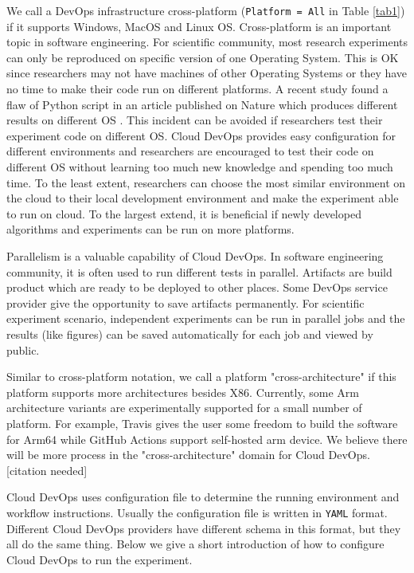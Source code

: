 \documentclass[10pt, conference, compsocconf]{IEEEtran}
\begin{document}
We call a DevOps infrastructure cross-platform (\texttt{Platform = All} in Table  \ref{tab1}) if it supports Windows, MacOS and Linux 
OS.
Cross-platform is an important topic in software engineering. For scientific community, most research experiments can only be reproduced on specific version of one Operating System. This is OK since researchers may not have machines of other Operating Systems or they have no time to make their code run on different platforms. A recent study found a flaw of Python script in an article published on Nature which produces different results on different OS \cite{bhandari2019characterization}. This incident can be avoided if researchers test their experiment code on different OS. Cloud DevOps provides easy configuration for different environments and researchers are encouraged to test their code on different OS without learning too much new knowledge and spending too much time. To the least extent, researchers can choose the most similar environment on the cloud to their local development environment and make the experiment able to run on cloud. To the largest extend, it is beneficial if newly developed algorithms and experiments can be run on more platforms.

Parallelism is a valuable capability of Cloud DevOps. In software engineering community, it is often used to run different tests in parallel.
Artifacts are build product which are ready to be deployed to other places.
Some DevOps service provider give the opportunity to save artifacts permanently. For scientific experiment scenario, independent experiments can be run in parallel jobs and the results (like figures) can be saved automatically for each job and viewed by public.

Similar to cross-platform notation, we call a platform "cross-architecture" if this platform supports more architectures besides X86. Currently, some Arm architecture variants are experimentally supported for a small number of platform. For example, Travis gives the user some freedom to build the software
for Arm64 while GitHub Actions support self-hosted arm device. We believe there will be more process in the "cross-architecture" domain for Cloud DevOps. [citation needed]
 
Cloud DevOps uses configuration file to determine the running environment and workflow instructions. 
Usually the configuration file is written in \texttt{YAML} format. Different Cloud DevOps providers have different schema in this format, but they all do the same thing. Below we give a short introduction of how to configure Cloud DevOps to run the experiment.
\end{document}
